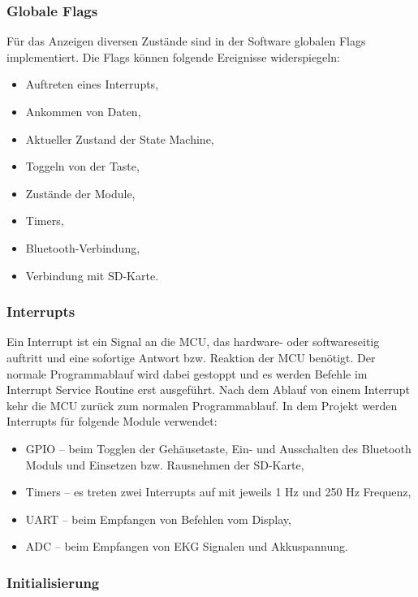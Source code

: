 \subsubsection{Globale Flags}

Für das Anzeigen diversen Zustände sind in der Software globalen Flags implementiert. Die Flags können folgende Ereignisse widerspiegeln:
\begin{itemize}
    \item Auftreten eines Interrupts,
    \item Ankommen von Daten,
    \item Aktueller Zustand der State Machine,
    \item Toggeln von der Taste,
    \item Zustände der Module,
    \item Timers,
    \item Bluetooth-Verbindung,
    \item Verbindung mit SD-Karte.
\end{itemize} 

\subsubsection{Interrupts}

Ein Interrupt ist ein Signal an die MCU, das hardware- oder softwareseitig auftritt und eine sofortige Antwort bzw. Reaktion der MCU benötigt. Der normale Programmablauf wird dabei gestoppt und es werden Befehle im Interrupt Service Routine erst ausgeführt. Nach dem Ablauf von einem Interrupt kehr die MCU zurück zum normalen Programmablauf.
In dem Projekt werden Interrupts für folgende Module verwendet:
\begin{itemize}
    \item GPIO – beim Togglen der Gehäusetaste, Ein- und Ausschalten des Bluetooth Moduls und Einsetzen bzw. Rausnehmen der SD-Karte,
    \item Timers – es treten zwei Interrupts auf mit jeweils 1 Hz und 250 Hz Frequenz,
    \item UART – beim Empfangen von Befehlen vom Display,
    \item ADC – beim Empfangen von EKG Signalen und Akkuspannung.
\end{itemize} 

\subsubsection{Initialisierung}

